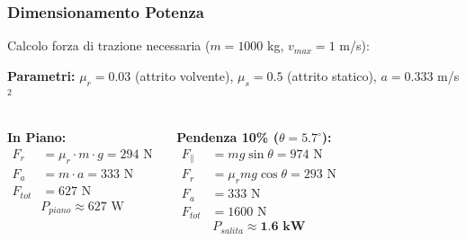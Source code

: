 \begin{frame}
    \frametitle{Dimensionamento Potenza}
    Calcolo forza di trazione necessaria ($m=1000$ kg, $v_{max}=1$ m/s):

    \textbf{Parametri:} $\mu_r = 0.03$ (attrito volvente), $\mu_s = 0.5$ (attrito statico), $a = 0.333$ m/s$^2$
    \vspace{0.2cm}
    \begin{columns}
        \textbf{In Piano:}
        \begin{equation*}
            \begin{aligned}
                F_r     & = \mu_r \cdot m \cdot g = 294 \text{ N} \\
                F_a     & = m \cdot a = 333 \text{ N}             \\
                F_{tot} & = 627 \text{ N}
            \end{aligned}
        \end{equation*}
        $$P_{piano} \approx 627 \text{ W}$$

        \textbf{Pendenza 10\% ($\theta=5.7^\circ$):}
        \begin{equation*}
            \begin{aligned}
                F_{\parallel} & = mg\sin\theta = 974 \text{ N}       \\
                F_r           & = \mu_r mg\cos\theta = 293 \text{ N} \\
                F_a           & = 333 \text{ N}                      \\
                F_{tot}       & = 1600 \text{ N}
            \end{aligned}
        \end{equation*}
        $$P_{salita} \approx \textbf{1.6 kW}$$
    \end{columns}
\end{frame}

